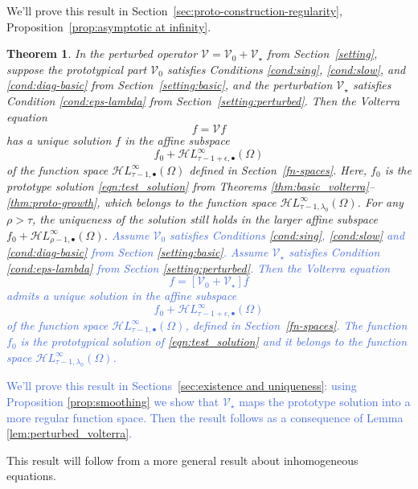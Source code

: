 \documentclass{article}
\theoremstyle{plain}
\newtheorem{thm}{Theorem}
\newcommand{\singexp}[2]{\mathcal{H}L^\infty_{#1, #2}}
\newcommand{\singexpalg}[1]{\singexp{#1}{\bullet}}
\newcommand{\volterra}{\mathcal{V}}
\newcommand{\hardpart}{\mathcal{V}_0}
\newcommand{\softpart}{\mathcal{V}_\star}
\begin{document}
We'll prove this result in Section~\ref{sec:proto-construction-regularity}, Proposition~\ref{prop:asymptotic at infinity}.
\begin{thm}\label{thm:general_volterra}
In the perturbed operator $\volterra = \hardpart +\softpart$ from Section~\ref{setting}, suppose the prototypical part $\hardpart$ satisfies {\em Conditions \eqref{cond:sing}}, \eqref{cond:slow}, and \eqref{cond:diag-basic} from Section~\ref{setting:basic}, and the perturbation $\softpart$ satisfies Condition \eqref{cond:eps-lambda} from Section~\ref{setting:perturbed}. Then the Volterra equation
\[f = \volterra f\]
has a unique solution $f$ in the affine subspace
\[ f_0 + \singexpalg{\tau-1+\epsilon}(\Omega) \]
of the function space $\singexpalg{\tau-1}(\Omega)$ defined in Section~\ref{fn-spaces}. Here, $f_0$ is the prototype solution \eqref{eqn:test_solution} from Theorems \ref{thm:basic_volterra}--\ref{thm:proto-growth}, which belongs to the function space $\singexp{\tau-1}{\lambda_0}(\Omega)$. For any $\rho > \tau$, the uniqueness of the solution still holds in the larger affine subspace $f_0 + \singexpalg{\rho-1}(\Omega)$.
\textcolor{RoyalBlue}{Assume $\hardpart$ satisfies {\em Conditions \eqref{cond:sing}, \eqref{cond:slow}} and {\em \eqref{cond:diag-basic}} from Section \ref{setting:basic}. Assume $\softpart$ satisfies {\em Condition \eqref{cond:eps-lambda}} from Section \ref{setting:perturbed}. Then the Volterra equation 
\[f = \left[ \hardpart + \softpart \right] f\]
admits a unique solution in the affine subspace
\[ f_0 + \singexpalg{\tau-1+\epsilon}(\Omega) \]
of the function space $\singexpalg{\tau-1}(\Omega)$, defined in Section~\ref{fn-spaces}. The function $f_0$ is the prototypical solution of \eqref{eqn:test_solution} and it belongs to the function space $\singexp{\tau-1}{\lambda_0}(\Omega)$.}
\end{thm}
\textcolor{RoyalBlue}{We'll prove this result in Sections~\ref{sec:existence and uniqueness}: using Proposition \ref{prop:smoothing} we show that $\softpart$ maps the prototype solution into a more regular function space. Then the result follows as a consequence of Lemma \ref{lem:perturbed_volterra}.}\par
This result will follow from a more general result about inhomogeneous equations.
\end{document}

